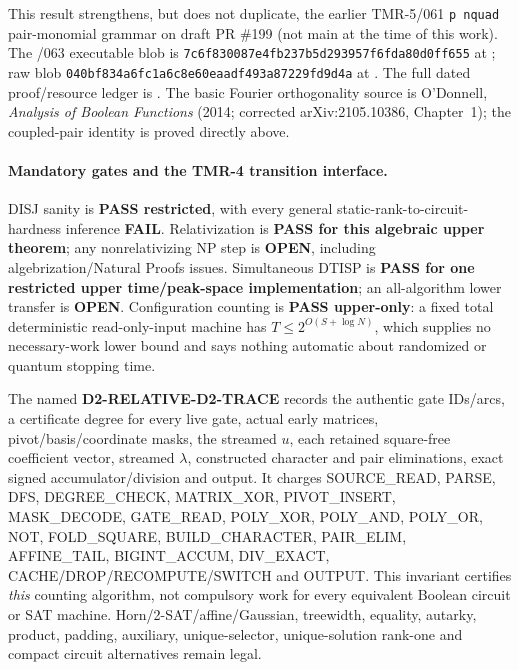\documentclass[11pt]{article}
\begin{document}
This result strengthens, but does not duplicate, the earlier
TMR-5/061 \texttt{p nquad} pair-monomial grammar on
draft PR \#199 (not main at the time of this work).
The /063 executable blob is
\texttt{7c6f830087e4fb237b5d293957f6fda80d0ff655}
at ;
raw blob \texttt{040bf834a6fc1a6c8e60eaadf493a87229fd9d4a}
at .
The full dated proof/resource ledger is
.
The basic Fourier orthogonality source is O'Donnell,
\emph{Analysis of Boolean Functions} (2014; corrected
arXiv:2105.10386, Chapter~1); the coupled-pair identity is
proved directly above.

\paragraph{Mandatory gates and the TMR-4 transition interface.}
DISJ sanity is \textbf{PASS restricted}, with every
general static-rank-to-circuit-hardness inference \textbf{FAIL}.
Relativization is \textbf{PASS for this algebraic upper theorem};
any nonrelativizing NP step is \textbf{OPEN}, including
algebrization/Natural Proofs issues.
Simultaneous DTISP is \textbf{PASS for one restricted upper
time/peak-space implementation}; an all-algorithm lower transfer
is \textbf{OPEN}.  Configuration counting is \textbf{PASS
upper-only}: a fixed total deterministic read-only-input machine
has $T\le2^{O(S+\log N)}$, which supplies no necessary-work
lower bound and says nothing automatic about randomized or quantum
stopping time.

The named \textbf{D2-RELATIVE-D2-TRACE} records the authentic
gate IDs/arcs, a certificate degree for every live gate,
actual early matrices, pivot/basis/coordinate masks,
the streamed $u$, each retained square-free coefficient vector,
streamed $\lambda$, constructed character and pair eliminations,
exact signed accumulator/division and output.
It charges SOURCE\_READ, PARSE, DFS, DEGREE\_CHECK,
MATRIX\_XOR, PIVOT\_INSERT, MASK\_DECODE, GATE\_READ,
POLY\_XOR, POLY\_AND, POLY\_OR, NOT, FOLD\_SQUARE,
BUILD\_CHARACTER, PAIR\_ELIM, AFFINE\_TAIL,
BIGINT\_ACCUM, DIV\_EXACT, CACHE/DROP/RECOMPUTE/SWITCH
and OUTPUT.  This invariant certifies \emph{this}
counting algorithm, not compulsory work for every equivalent
Boolean circuit or SAT machine.  Horn/2-SAT/affine/Gaussian,
treewidth, equality, autarky, product, padding, auxiliary,
unique-selector, unique-solution rank-one and compact
circuit alternatives remain legal.
\end{document}
